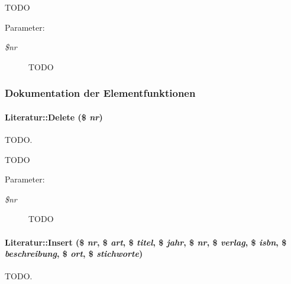 TODO \begin{Desc}
\item[Parameter:]
\begin{description}
\item[{\em \$nr}]TODO \end{description}
\end{Desc}


\subsubsection{Dokumentation der Elementfunktionen}
\hypertarget{classLiteratur_f5b265d349df2a9d17079b81d808fa89}{
\paragraph[Delete]{\setlength{\rightskip}{0pt plus 5cm}Literatur::Delete (\$ {\em nr})}\hfill}
\label{classLiteratur_f5b265d349df2a9d17079b81d808fa89}


TODO. 

TODO \begin{Desc}
\item[Parameter:]
\begin{description}
\item[{\em \$nr}]TODO \end{description}
\end{Desc}
\hypertarget{classLiteratur_6d2064fd0c0be78e10f992396dfd43a4}{
\paragraph[Insert]{\setlength{\rightskip}{0pt plus 5cm}Literatur::Insert (\$ {\em nr}, \$ {\em art}, \$ {\em titel}, \$ {\em jahr}, \$ {\em nr}, \$ {\em verlag}, \$ {\em isbn}, \$ {\em beschreibung}, \$ {\em ort}, \$ {\em stichworte})}\hfill}
\label{classLiteratur_6d2064fd0c0be78e10f992396dfd43a4}


TODO. 


